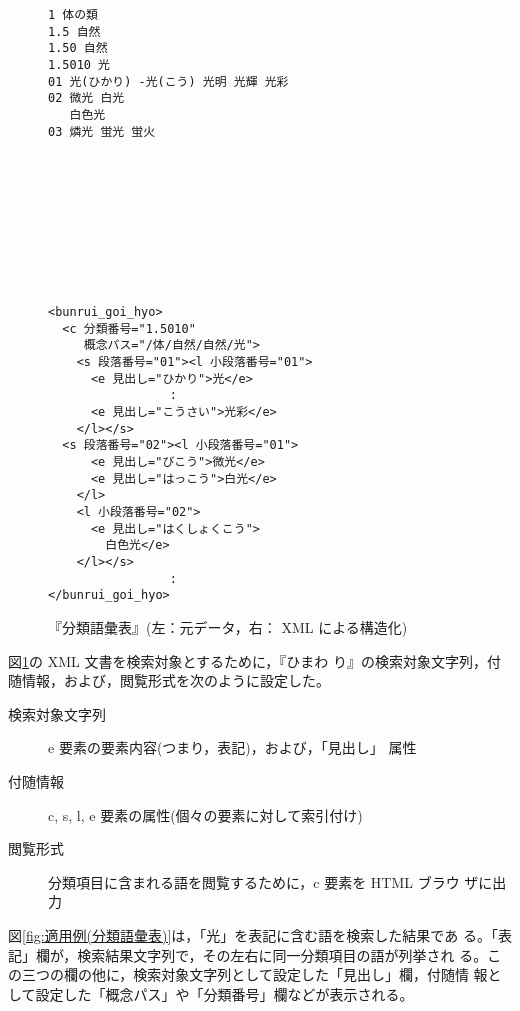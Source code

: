 \begin{figure}[hbt]
\begin{minipage}{.45\linewidth}
{\small
\begin{verbatim}
1 体の類
1.5 自然
1.50 自然
1.5010 光
01 光(ひかり) -光(こう) 光明 光輝 光彩
02 微光 白光
   白色光
03 燐光 蛍光 蛍火










\end{verbatim}}
\end{minipage}\hspace{2.5em}
\begin{minipage}{.45\linewidth}
{\small
\begin{verbatim}
<bunrui_goi_hyo>
  <c 分類番号="1.5010"
     概念パス="/体/自然/自然/光">
    <s 段落番号="01"><l 小段落番号="01">
      <e 見出し="ひかり">光</e>
                 :
      <e 見出し="こうさい">光彩</e>
    </l></s>
  <s 段落番号="02"><l 小段落番号="01">
      <e 見出し="びこう">微光</e>
      <e 見出し="はっこう">白光</e>
    </l>
    <l 小段落番号="02">
      <e 見出し="はくしょくこう">
        白色光</e>
    </l></s>
                 :
</bunrui_goi_hyo>
\end{verbatim}}
\end{minipage}
 \caption{『分類語彙表』(左：元データ，右： XML による構造化)}
 \label{fig:分類語彙表データ)}
\end{figure}

図\ref{fig:分類語彙表データ)}の XML 文書を検索対象とするために，『ひまわ
り』の検索対象文字列，付随情報，および，閲覧形式を次のように設定した。

\begin{description}
 \item[検索対象文字列] e 要素の要素内容(つまり，表記)，および，「見出し」
	    属性
 \item[付随情報] c, s, l, e 要素の属性(個々の要素に対して索引付け)
 \item[閲覧形式] 分類項目に含まれる語を閲覧するために，c 要素を HTML ブラウ
	    ザに出力
\end{description}

図\ref{fig:適用例(分類語彙表)}は，「光」を表記に含む語を検索した結果であ
る。「表記」欄が，検索結果文字列で，その左右に同一分類項目の語が列挙され
る。この三つの欄の他に，検索対象文字列として設定した「見出し」欄，付随情
報として設定した「概念パス」や「分類番号」欄などが表示される。

